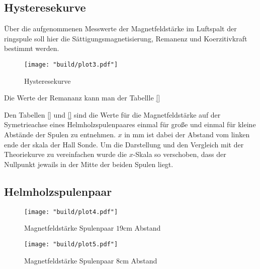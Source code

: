 \subsection{Hysteresekurve}
Über die aufgenommenen Messwerte der Magnetfeldstärke im Luftspalt der ringspule soll hier 
die Sättigungsmagnetisierung, Remanenz und Koerzitivkraft bestimmt werden.
\begin{figure}[H]
    \caption{Hysteresekurve}
    \label{fig:3}
    \centering
    \texttt{[image: "build/plot3.pdf"]}
\end{figure}
Die Werte der Remananz kann man der Tabellle \autoref{}





Den Tabellen \autoref{} und \autoref{} sind die Werte für die Magnetfeldstärke auf der 
Symetrieachse eines Helmholzspulenpaares einmal für große und einmal für kleine 
Abstände der Spulen zu entnehmen. $x$ in $\unit{\milli\meter} $ ist dabei der Abstand 
vom linken ende der skala der Hall Sonde. Um die Darstellung und den Vergleich mit der 
Theoriekurve zu vereinfachen wurde die $x$-Skala so verschoben, dass der Nullpunkt jewails 
in der Mitte der beiden Spulen liegt.
\subsection{Helmholzspulenpaar}
\begin{figure}
    \caption{Magnetfeldstärke Spulenpaar $19\unit{\centi\meter}$ Abstand}
    \label{fig:4}
    \centering
    \texttt{[image: "build/plot4.pdf"]}
\end{figure}

\begin{figure}
    \caption{Magnetfeldstärke Spulenpaar $8\unit{\centi\meter}$ Abstand}
    \label{fig:5}
    \centering
    \texttt{[image: "build/plot5.pdf"]}
\end{figure}